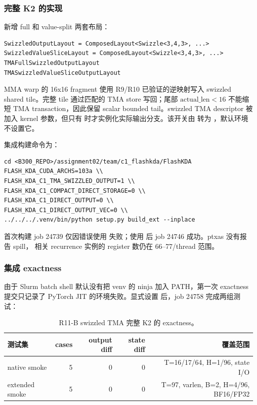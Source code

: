 \subsubsection{完整 K2 的实现}

 新增 full 和 value-split 两套布局：

\begin{lstlisting}
SwizzledOutputLayout = ComposedLayout<Swizzle<3,4,3>, ...>
SwizzledValueSliceLayout = ComposedLayout<Swizzle<3,4,3>, ...>
TMAFullSwizzledOutputLayout
TMASwizzledValueSliceOutputLayout
\end{lstlisting}

MMA warp 的 16x16 fragment 使用 R9/R10 已验证的逆映射写入 swizzled shared
tile。完整 tile 通过匹配的 TMA store 写回；尾部 \(\text{actual\_len}<16\)
不能缩短 TMA transaction，因此保留 scalar bounded tail。swizzled TMA
descriptor 被加入 kernel 参数，但只有 
时才实例化实际输出分支。该开关由  转为
，默认环境不设置它。

集成构建命令为：

\begin{lstlisting}
cd <B300_REPO>/assignment02/team/c1_flashkda/FlashKDA
FLASH_KDA_CUDA_ARCHS=103a \\
FLASH_KDA_C1_TMA_SWIZZLED_OUTPUT=1 \\
FLASH_KDA_C1_COMPACT_DIRECT_STORAGE=0 \\
FLASH_KDA_C1_DIRECT_OUTPUT=0 \\
FLASH_KDA_C1_DIRECT_OUTPUT_VEC=0 \\
../../../.venv/bin/python setup.py build_ext --inplace
\end{lstlisting}

首次构建 job 24739 仅因错误使用  失败；使用
 后 job 24746 成功。ptxas 没有报告 spill，
相关 recurrence 实例的 register 数仍在 66--77/thread 范围。

\subsubsection{集成 exactness}

由于 Slurm batch shell 默认没有把 venv 的 ninja 加入 PATH，第一次 exactness
提交只记录了 PyTorch JIT 的环境失败。显式设置
 后，job 24758 完成两组测试：

\begin{table}[htbp]
\centering
\small
\begin{tabular}{l r r r r}
\toprule
测试集 & cases & output diff & state diff & 覆盖范围 \\
\midrule
native smoke & 5 & 0 & 0 & T=16/17/64, H=1/96, state I/O \\
extended smoke & 5 & 0 & 0 & T=97, varlen, B=2, H=4/96, BF16/FP32 \\
\bottomrule
\end{tabular}
\caption{R11-B swizzled TMA 完整 K2 的 exactness。}
\end{table}

